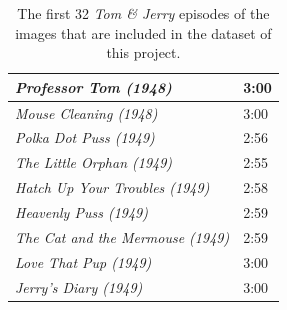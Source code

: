 \documentclass[report, 11pt, oneside]{dissertation}
\begin{document}
\begin{table}[]
\begin{tabular}{l|l|}
\multicolumn{1}{|l|}{\textit{Professor Tom (1948)}} & 3:00 \\ \hline
\multicolumn{1}{|l|}{\textit{Mouse Cleaning (1948)}} & 3:00 \\ \hline
\multicolumn{1}{|l|}{\textit{Polka Dot Puss (1949)}} & 2:56 \\ \hline
\multicolumn{1}{|l|}{\textit{The Little Orphan (1949)}} & 2:55 \\ \hline
\multicolumn{1}{|l|}{\textit{Hatch Up Your Troubles (1949)}} & 2:58 \\ \hline
\multicolumn{1}{|l|}{\textit{Heavenly Puss (1949)}} & 2:59 \\ \hline
\multicolumn{1}{|l|}{\textit{The Cat and the Mermouse (1949)}} & 2:59 \\ \hline
\multicolumn{1}{|l|}{\textit{Love That Pup (1949)}} & 3:00 \\ \hline
\multicolumn{1}{|l|}{\textit{Jerry's Diary (1949)}} & 3:00 \\ \hline
\end{tabular}
\centering
\caption{The first 32 \textit{Tom \& Jerry} episodes of the images that are included in the dataset of this project.}
\label{tab:dataset_videos_1}
\end{table}
\end{document}
